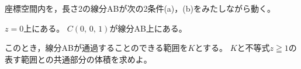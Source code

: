 \documentclass[../../main.tex]{subfiles}
\begin{document}
座標空間内を，長さ2の線分ABが次の2条件(a)，(b)をみたしながら動く。
\begin{enumerate}
  $z=0$上にある。
  $C(0, \, 0, \, 1)$が線分AB上にある。
\end{enumerate}
このとき，線分ABが通過することのできる範囲を$K$とする。
$K$と不等式$z \geqq 1$の表す範囲との共通部分の体積を求めよ。
\end{document}
